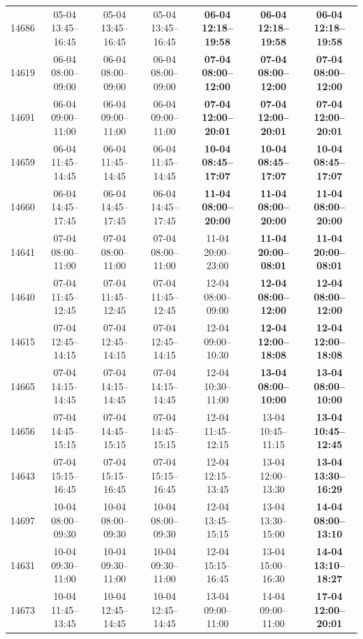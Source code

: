 \begin{table}[htbp]
\begin{tabular}{|r|c|c|c|c|c|c|}
14686 & 05-04 13:45--16:45 & 05-04 13:45--16:45 & 05-04 13:45--16:45 & \textbf{06-04 12:18--19:58} & \textbf{06-04 12:18--19:58} & \textbf{06-04 12:18--19:58} \\ 
14619 & 06-04 08:00--09:00 & 06-04 08:00--09:00 & 06-04 08:00--09:00 & \textbf{07-04 08:00--12:00} & \textbf{07-04 08:00--12:00} & \textbf{07-04 08:00--12:00} \\ 
14691 & 06-04 09:00--11:00 & 06-04 09:00--11:00 & 06-04 09:00--11:00 & \textbf{07-04 12:00--20:01} & \textbf{07-04 12:00--20:01} & \textbf{07-04 12:00--20:01} \\ 
14659 & 06-04 11:45--14:45 & 06-04 11:45--14:45 & 06-04 11:45--14:45 & \textbf{10-04 08:45--17:07} & \textbf{10-04 08:45--17:07} & \textbf{10-04 08:45--17:07} \\ 
14660 & 06-04 14:45--17:45 & 06-04 14:45--17:45 & 06-04 14:45--17:45 & \textbf{11-04 08:00--20:00} & \textbf{11-04 08:00--20:00} & \textbf{11-04 08:00--20:00} \\ 
14641 & 07-04 08:00--11:00 & 07-04 08:00--11:00 & 07-04 08:00--11:00 & 11-04 20:00--23:00 & \textbf{11-04 20:00--08:01} & \textbf{11-04 20:00--08:01} \\ 
14640 & 07-04 11:45--12:45 & 07-04 11:45--12:45 & 07-04 11:45--12:45 & 12-04 08:00--09:00 & \textbf{12-04 08:00--12:00} & \textbf{12-04 08:00--12:00} \\ 
14615 & 07-04 12:45--14:15 & 07-04 12:45--14:15 & 07-04 12:45--14:15 & 12-04 09:00--10:30 & \textbf{12-04 12:00--18:08} & \textbf{12-04 12:00--18:08} \\ 
14665 & 07-04 14:15--14:45 & 07-04 14:15--14:45 & 07-04 14:15--14:45 & 12-04 10:30--11:00 & \textbf{13-04 08:00--10:00} & \textbf{13-04 08:00--10:00} \\ 
14656 & 07-04 14:45--15:15 & 07-04 14:45--15:15 & 07-04 14:45--15:15 & 12-04 11:45--12:15 & 13-04 10:45--11:15 & \textbf{13-04 10:45--12:45} \\ 
14643 & 07-04 15:15--16:45 & 07-04 15:15--16:45 & 07-04 15:15--16:45 & 12-04 12:15--13:45 & 13-04 12:00--13:30 & \textbf{13-04 13:30--16:29} \\ 
14697 & 10-04 08:00--09:30 & 10-04 08:00--09:30 & 10-04 08:00--09:30 & 12-04 13:45--15:15 & 13-04 13:30--15:00 & \textbf{14-04 08:00--13:10} \\ 
14631 & 10-04 09:30--11:00 & 10-04 09:30--11:00 & 10-04 09:30--11:00 & 12-04 15:15--16:45 & 13-04 15:00--16:30 & \textbf{14-04 13:10--18:27} \\ 
14673 & 10-04 11:45--13:45 & 10-04 12:45--14:45 & 10-04 12:45--14:45 & 13-04 09:00--11:00 & 14-04 09:00--11:00 & \textbf{17-04 12:00--20:01} \\ 

\end{tabular}
\end{table}
